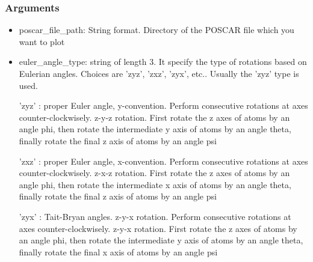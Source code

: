 \documentclass[12pt]{book}
\begin{document}
\subsubsection{Arguments}
\begin{itemize}
\item poscar\_file\_path: String format. Directory of the POSCAR file which you want to plot
\item euler\_angle\_type: string of length 3. It specify the type of rotations based on Eulerian angles. Choices are 'zyz', 'zxz', 'zyx', etc.. Usually the 'zyz' type is used.

            'zyz' : proper Euler angle, y-convention. Perform consecutive rotations at axes counter-clockwisely. z-y-z rotation.
                    First rotate the z axes of atoms by an angle phi, then rotate the intermediate y axis of atoms by an angle theta, finally rotate the final z axis of atoms by an angle psi

            'zxz' : proper Euler angle, x-convention. Perform consecutive rotations at axes counter-clockwisely. z-x-z rotation.
                    First rotate the z axes of atoms by an angle phi, then rotate the intermediate x axis of atoms by an angle theta, finally rotate the final z axis of atoms by an angle psi

            'zyx' : Tait-Bryan angles. z-y-x rotation. Perform consecutive rotations at axes counter-clockwisely. z-y-x rotation.
                    First rotate the z axes of atoms by an angle phi, then rotate the intermediate y axis of atoms by an angle theta, finally rotate the final x axis of atoms by an angle psi


\end{itemize}
\end{document}
